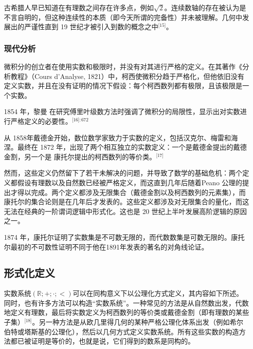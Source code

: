 古希腊人早已知道在有理数之间存在许多点，例如$\sqrt{2}$。连续数轴的存在被认为是不言自明的，但这种连续性的本质（即今天所谓的完备性）并未被理解。几何中发展出的严谨性直到 19 世纪才被引入到数的概念之中\(^\text{[15]}\)。
\subsubsection{现代分析}
微积分的创立者在使用实数和极限时，并没有对其进行严格的定义。在其著作《分析教程》（Cours d'Analyse, 1821）中，柯西使微积分趋于严格化，但他依旧没有定义实数，并且在没有证明的情况下假设：每个柯西数列都有极限，且该极限是一个实数。

1854 年，黎曼 在研究傅里叶级数方法时强调了微积分的局限性，显示出对实数进行严格定义的必要性。\(^\text{[16]: 672 }\)

从 1858年戴德金开始，数位数学家致力于实数的定义，包括汉克尔、梅雷和海涅。最终在 1872 年，出现了两个相互独立的实数定义：一个是戴德金提出的戴德金割，另一个是 康托尔提出的柯西数列的等价类。\(^\text{[17]}\)

然而，这些定义仍然留下了若干未解决的问题，并导致了数学的基础危机：两个定义都假设有理数以及自然数已经被严格定义，而这直到几年后随着Peano 公理的提出才得以完成。两个定义都涉及无限集合（戴德金割以及柯西数列的元素集），而康托尔的集合论则是在几年后才发表的。这些定义都涉及对无限集合的量化，而这无法在经典的一阶谓词逻辑中形式化。这也是 20 世纪上半叶发展高阶逻辑的原因之一。

1874 年，康托尔证明了实数集是不可数无限的，而代数数集是可数无限的。康托尔最初的不可数性证明不同于他在1891年发表的著名的对角线论证。
\subsection{形式化定义}
实数系统$(\mathbb{R}; +; \cdot; <)$可以在同构意义下以公理化方式定义，其内容如下所述。同时，也有许多方法可以构造“实数系统”。一种常见的方法是从自然数出发，代数地定义有理数，最后将实数定义为柯西数列的等价类或戴德金割（即有理数的某些子集）\(^\text{[18]}\)。另一种方法是从欧几里得几何的某种严格公理化体系出发（例如希尔伯特或塔斯基的公理化），然后以几何方式定义实数系统。所有这些实数的构造方法都已被证明是等价的，也就是说，它们得到的数系是同构的。
